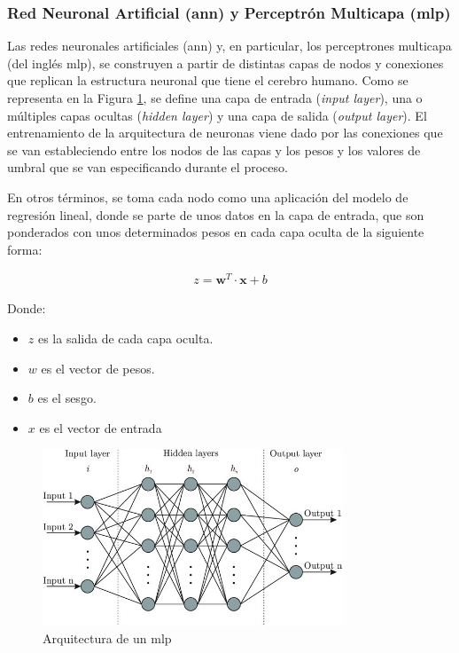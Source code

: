 \subsubsection{Red Neuronal Artificial (\acrshort{ann}) y Perceptrón Multicapa (\acrshort{mlp})}
\label{sec:dlann}

Las redes neuronales artificiales (\gls{ann}) y, en particular, los perceptrones multicapa (del inglés \gls{mlp}), se construyen a partir de distintas capas de nodos y conexiones que replican la estructura neuronal que tiene el cerebro humano. Como se representa en la Figura \ref{fig:ann}, se define una capa de entrada (\textit{input layer}), una o múltiples capas ocultas (\textit{hidden layer}) y una capa de salida (\textit{output layer}). El entrenamiento de la arquitectura de neuronas viene dado por las conexiones que se van estableciendo entre los nodos de las capas y los pesos y los valores de umbral que se van especificando durante el proceso. \cite{ibmann}

\vspace{3mm}

En otros términos, se toma cada nodo como una aplicación del modelo de regresión lineal, donde se parte de unos datos en la capa de entrada, que son ponderados con unos determinados pesos en cada capa oculta de la siguiente forma:

\begin{equation}
    \begin{aligned}
        z = \mathbf{w}^T \cdot \mathbf{x} + b
    \end{aligned}
\end{equation} 

Donde:
\begin{itemize}
    \renewcommand{\labelitemi}{}
    \item \(z\) es la salida de cada capa oculta. 
    \item \(w\) es el vector de pesos. 
    \item \(b\) es el sesgo.
    \item \(x\) es el vector de entrada
\end{itemize}

\vspace{3mm}

\begin{figure}[h!]
    \centering
    \includegraphics[width=0.8\textwidth]{img/teoria/ann.jpg}
    \caption{Arquitectura de un \acrshort{mlp} \cite{ann}}
    \label{fig:ann}
\end{figure}

